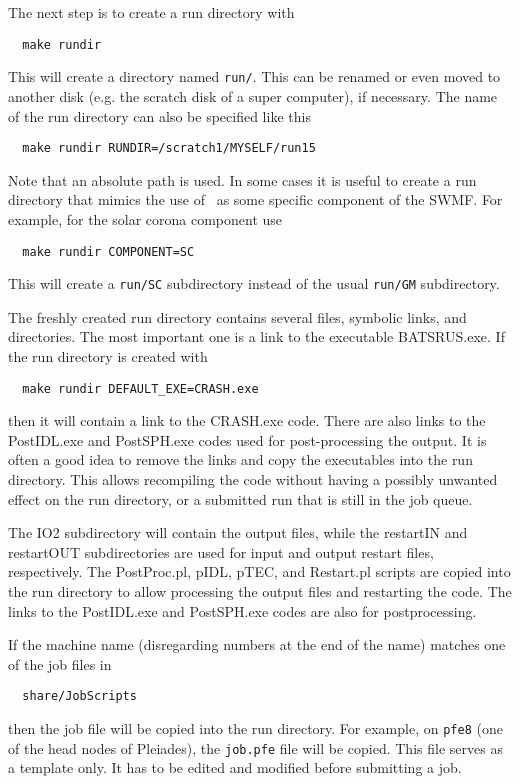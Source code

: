 The next step is to create a run directory with
\begin{verbatim}
  make rundir
\end{verbatim}
This will create a directory named {\tt run/}. This can be renamed
or even moved to another disk (e.g. the scratch disk of a super
computer), if necessary. The name of the run directory can also
be specified like this 
\begin{verbatim}
  make rundir RUNDIR=/scratch1/MYSELF/run15
\end{verbatim}
Note that an absolute path is used. 
In some cases it is useful to create a run directory that mimics
the use of \BATSRUS\ as some specific component of the SWMF. 
For example, for the solar corona component use
\begin{verbatim}
  make rundir COMPONENT=SC
\end{verbatim}
This will create a {\tt run/SC} subdirectory instead of the usual
{\tt run/GM} subdirectory.

The freshly created run directory contains several files, symbolic links, 
and directories. The most important one is a link to the executable BATSRUS.exe. 
If the run directory is created with
\begin{verbatim}
  make rundir DEFAULT_EXE=CRASH.exe
\end{verbatim}
then it will contain a link to the CRASH.exe code. There are also links to
the PostIDL.exe and PostSPH.exe codes used for post-processing the output.
It is often a good idea to remove the links and copy the executables into
the run directory. This allows recompiling the code without having a possibly
unwanted effect on the run directory, or a submitted run that is still in 
the job queue.

The IO2 subdirectory will contain the output files, while the restartIN and restartOUT
subdirectories are used for input and output restart files, respectively.
The PostProc.pl, pIDL, pTEC, and Restart.pl scripts are copied into the 
run directory to allow processing the output files and restarting the code.
The links to the PostIDL.exe and PostSPH.exe codes are also for postprocessing.

If the machine name (disregarding numbers at the end of the name) matches 
one of the job files in 
\begin{verbatim}
  share/JobScripts
\end{verbatim}
then the job file will be copied
into the run directory. For example, on {\tt pfe8} (one of the head nodes 
of Pleiades), the {\tt job.pfe} file will be copied. This file serves as a
template only. It has to be edited and modified before submitting a job.

